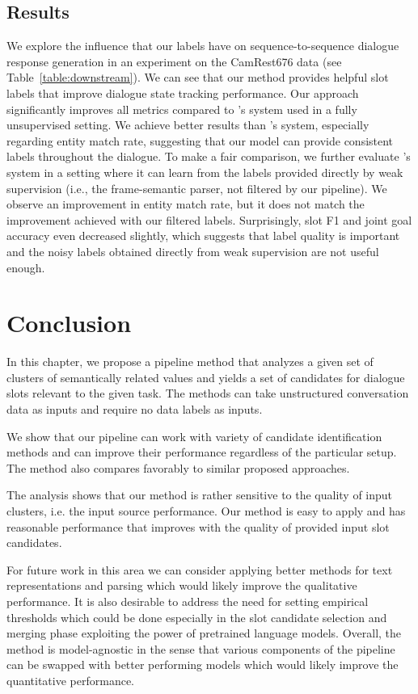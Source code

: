 \subsection{Results} We explore the influence that our labels have on sequence-to-sequence dialogue response generation in an experiment on the CamRest676 data (see Table~\ref{table:downstream}).
We can see that our method provides helpful slot labels that improve dialogue state tracking performance.
Our approach significantly improves all metrics compared to \citet{jin2018explicit}'s system used in a fully unsupervised setting.
We achieve better results than \citet{jin2018explicit}'s system, especially regarding entity match rate, suggesting that our model can provide consistent labels throughout the dialogue.
To make a fair comparison, we further evaluate \citet{jin2018explicit}'s system in a setting where it can learn from the labels provided directly by weak supervision (i.e., the frame-semantic parser, not filtered by our pipeline).
We observe an improvement in entity match rate, but it does not match the improvement achieved with our filtered labels. Surprisingly, slot F1 and joint goal accuracy even decreased slightly, 
which suggests that label quality is important and the noisy labels obtained directly from weak supervision are not useful enough.

\section{Conclusion}
In this chapter, we propose a pipeline method that analyzes a given set of clusters of semantically related values and yields a set of candidates for dialogue slots relevant to the given task.
The methods can take unstructured conversation data as inputs and require no data labels as inputs.

We show that our pipeline can work with variety of candidate identification methods and can improve their performance regardless of the particular setup.
The method also compares favorably to similar proposed approaches.

The analysis shows that our method is rather sensitive to the quality of input clusters, i.e. the input source performance.
Our method is easy to apply and has reasonable performance that improves with the quality of provided input slot candidates.

For future work in this area we can consider applying better methods for text representations and parsing which would likely improve the qualitative performance.
It is also desirable to address the need for setting empirical thresholds which could be done especially in the slot candidate selection and merging phase exploiting the power of pretrained language models.
Overall, the method is model-agnostic in the sense that various components of the pipeline can be swapped with better performing models which would likely improve the quantitative performance.
